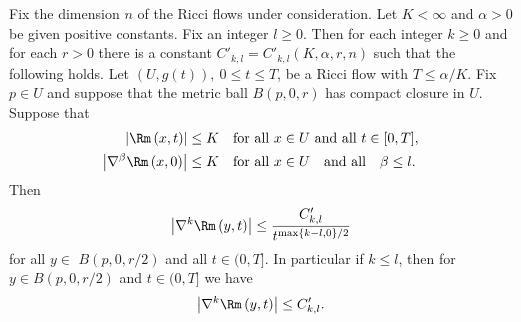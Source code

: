 \begin{theorem}\label{thm:shi-with-initial-derivatives}
\label{shiw/deriv}

Fix the dimension $n$ of the Ricci flows under consideration. Let
$K<\infty$ and $\alpha>0$ be given positive constants. Fix an
integer $l\ge 0$. Then for each integer $k\ge 0$ and for each $r>0$
there is a constant $C'_{k,l}=C'_{k,l}(K,\alpha,r,n)$ such that the
following holds. Let $(U,g(t)),\ 0\le t\le T$, be a Ricci flow with
$T\le \alpha/K$. Fix $p\in U$ and suppose that the metric ball
$B(p,0,r)$ has compact closure in $U$. Suppose that
\begin{eqnarray*}
\left\vert \Rm\left(  x,t\right)  \right\vert  &
\leq K\ \ \text{ for all }x\in U\text{ and all}\  t\in[0,T],\\
\left\vert \nabla^{\beta}\Rm\left(  x,0\right)
\right\vert  & \leq K\ \ \text{ for all }x\in U\ \ \text{ and all }\
\ \beta\leq l.
\end{eqnarray*}
Then
\[
\left\vert \nabla^{k}\Rm\left(  y,t\right)
\right\vert
\leq\frac{C'_{k,l}}{t^{\max\left\{  k-l,0\right\}  /2}}%
\]
for all $y\in$ $B(p,0,r/2)  $ and all $t\in(0,T].$ In particular if
$k\leq l$, then for $y\in B(p,0,r/2)$ and $t\in (0,T]$ we have
\[
\left\vert \nabla^{k}\Rm\left(  y,t\right)
\right\vert \leq C_{k,l}'.
\]
\end{theorem}


